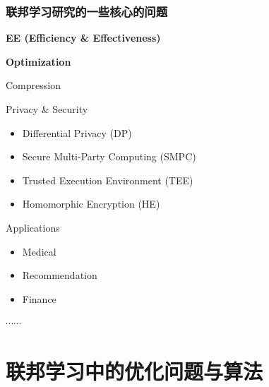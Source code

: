 
\begin{frame}
\frametitle{联邦学习研究的一些核心的问题}

\begin{itemize}
    \item {\Large\bfseries EE (Efficiency \& Effectiveness)}
    \begin{itemize}
        \item[$\bullet$] {\large\bfseries Optimization}
        \vspace{0.5em}
        \pause
        { \footnotesize
        \item[$\bullet$] Compression
        }
    \end{itemize}
    \vspace{1em}
    { \footnotesize
    \item Privacy \& Security
    \begin{itemize}
        \item[$\bullet$] Differential Privacy (DP)
        \item[$\bullet$] Secure Multi-Party Computing (SMPC)
        \item[$\bullet$] Trusted Execution Environment (TEE)
        \item[$\bullet$] Homomorphic Encryption (HE)
    \end{itemize}
    \item Applications
    \begin{itemize}
        \item[$\bullet$] Medical
        \item[$\bullet$] Recommendation
        \item[$\bullet$] Finance
    \end{itemize}
    \item $\cdots\cdots$
    }
\end{itemize}

\end{frame}


\section[联邦学习中的优化]{联邦学习中的优化问题与算法}


